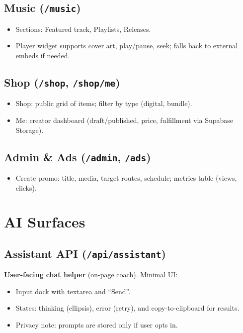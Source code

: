 \documentclass[11pt]{article}
\begin{document}
\subsection{Music (\texttt{/music})}
\begin{itemize}
  \item Sections: Featured track, Playlists, Releases.
  \item Player widget supports cover art, play/pause, seek; falls back to external embeds if needed.
\end{itemize}

\subsection{Shop (\texttt{/shop}, \texttt{/shop/me})}
\begin{itemize}
  \item Shop: public grid of items; filter by type (digital, bundle).
  \item Me: creator dashboard (draft/published, price, fulfillment via Supabase Storage).
\end{itemize}

\subsection{Admin \& Ads (\texttt{/admin}, \texttt{/ads})}
\begin{itemize}
  \item Create promo: title, media, target routes, schedule; metrics table (views, clicks).
\end{itemize}

\section{AI Surfaces}

\subsection{Assistant API (\texttt{/api/assistant})}
\textbf{User-facing chat helper} (on-page coach). Minimal UI:
\begin{itemize}
  \item Input dock with textarea and ``Send''.
  \item States: thinking (ellipsis), error (retry), and copy-to-clipboard for results.
  \item Privacy note: prompts are stored only if user opts in.
\end{itemize}
\end{document}
